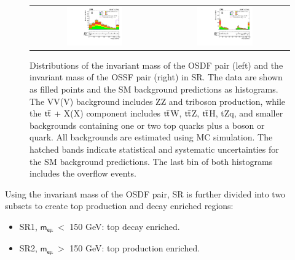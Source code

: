 \begin{figure}[tbh!]
 \begin{center}
 \begin{tabular}{cc}
 \includegraphics[width=0.45\textwidth]{figures/Part3/Selection/Memu}&
 \includegraphics[width=0.45\textwidth]{figures/Part3/Selection/Zmass} \\
 \end{tabular}
 \caption{Distributions of the invariant mass of the \ac{OSDF} pair (left) and the invariant mass of the \ac{OSSF} pair (right) in \ac{SR}. The data are shown as filled points and the \ac{SM} background predictions as histograms. The VV(V) background includes ZZ and triboson production, while the $\textsf{t}\overline{\textsf{t}}$ + X(X) component includes $\textsf{t}\overline{\textsf{t}}$W, $\textsf{t}\overline{\textsf{t}}$Z, $\textsf{t}\overline{\textsf{t}}$H, tZq, and smaller backgrounds containing one or two top quarks plus a boson or quark. All backgrounds are estimated using \ac{MC} simulation. The hatched bands indicate statistical and systematic uncertainties for the \ac{SM} background predictions. The last bin of both histograms includes the overflow events.}
 \label{fig:SR}
 \end{center}
\end{figure}

Using the invariant mass of the \ac{OSDF} pair, \ac{SR} is further divided into two subsets to create top production and decay enriched regions:

\begin{itemize}
\item SR1, $\textsf{m}_{\textsf{e}\upmu}~<$ 150 GeV: top decay enriched.
\item SR2, $\textsf{m}_{\textsf{e}\upmu}~>$ 150 GeV: top production enriched.
\end{itemize}
